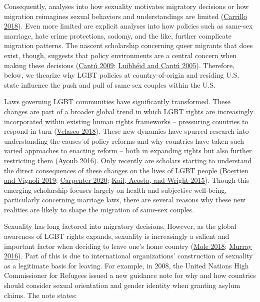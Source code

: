 \documentclass[
  11pt,
]{article}
\begin{document}
Consequently, analyses into how sexuality motivates migratory decisions or how migration reimagines sexual behaviors and understandings are limited (\protect\hyperlink{ref-carrillo_2018}{Carrillo 2018}). Even more limited are explicit analyses into how policies such as same-sex marriage, hate crime protections, sodomy, and the like, further complicate migration patterns. The nascent scholarship concerning queer migrants that does exist, though, suggests that policy environments are a central concern when making these decisions (\protect\hyperlink{ref-cantu_2009}{Cantú 2009}; \protect\hyperlink{ref-luibheid_2005}{Luibhéid and Cantú 2005}). Therefore, below, we theorize why LGBT policies at country-of-origin and residing U.S. state influence the push and pull of same-sex couples within the U.S.

Laws governing LGBT communities have significantly transformed. These changes are part of a broader global trend in which LGBT rights are increasingly incorporated within existing human rights frameworks -- pressuring countries to respond in turn (\protect\hyperlink{ref-velasco_2018}{Velasco 2018}). These new dynamics have spurred research into understanding the causes of policy reforms and why countries have taken such varied approaches to enacting reform -- both in expanding rights but also further restricting them (\protect\hyperlink{ref-ayoub_2016}{Ayoub 2016}). Only recently are scholars starting to understand the direct consequences of these changes on the lives of LGBT people (\protect\hyperlink{ref-boertien_2019}{Boertien and Vignoli 2019}; \protect\hyperlink{ref-carpenter_2020}{Carpenter 2020}; \protect\hyperlink{ref-kail_2015}{Kail, Acosta, and Wright 2015}). Though this emerging scholarship focuses largely on health and subjective well-being, particularly concerning marriage laws, there are several reasons why these new realities are likely to shape the migration of same-sex couples.

Sexuality has long factored into migratory decisions. However, as the global awareness of LGBT rights expands, sexuality is increasingly a salient and important factor when deciding to leave one's home country (\protect\hyperlink{ref-mole_2018a}{Mole 2018}; \protect\hyperlink{ref-murray_2016}{Murray 2016}). Part of this is due to international organizations' construction of sexuality as a legitimate basis for leaving. For example, in 2008, the United Nations High Commissioner for Refugees issued a new guidance note for why and how countries should consider sexual orientation and gender identity when granting asylum claims. The note states:
\end{document}
